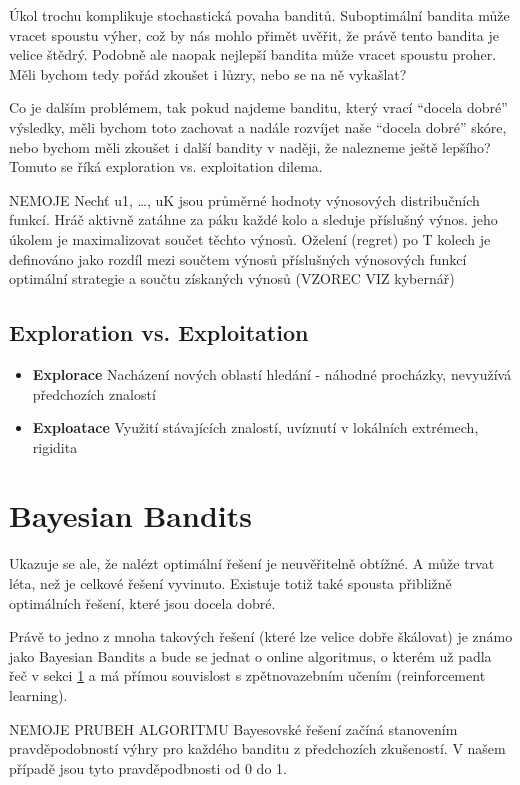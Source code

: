 \documentclass[thesis=M,czech]{FITthesis}[2014/05/07]
\begin{document}
Úkol trochu komplikuje stochastická povaha banditů. Suboptimální bandita může vracet spoustu výher, což by nás mohlo přimět uvěřit, že právě tento bandita je velice štědrý. Podobně ale naopak nejlepší bandita může vracet spoustu proher. Měli bychom tedy pořád zkoušet i lůzry, nebo se na ně vykašlat?

Co je dalším problémem, tak pokud najdeme banditu, který vrací “docela dobré” výsledky, měli bychom toto zachovat a nadále rozvíjet naše “docela dobré” skóre, nebo bychom měli zkoušet i další bandity v naději, že nalezneme ještě lepšího? Tomuto se říká exploration vs. exploitation dilema.

NEMOJE
Nechť u1, …, uK jsou průměrné hodnoty výnosových distribučních funkcí. Hráč aktivně zatáhne za páku každé kolo a sleduje příslušný výnos. jeho úkolem je maximalizovat součet těchto výnosů. Oželení (regret) po T kolech je definováno jako rozdíl mezi součtem výnosů příslušných výnosových funkcí optimální strategie a součtu získaných výnosů (VZOREC VIZ kybernář)

\subsection{Exploration vs. Exploitation}

\begin{itemize}
  \item \textbf{Explorace} Nacházení nových oblastí hledání - náhodné procházky, nevyužívá předchozích znalostí
  \item \textbf{Exploatace} Využití stávajících znalostí, uvíznutí v lokálních extrémech, rigidita
\end{itemize}	

\section{Bayesian Bandits}

Ukazuje se ale, že nalézt optimální řešení je neuvěřitelně obtížné. A může trvat léta, než je celkové řešení vyvinuto. Existuje totiž také spousta přibližně optimálních řešení, které jsou docela dobré. 

Právě to jedno z mnoha takových řešení (které lze velice dobře škálovat) je známo jako Bayesian Bandits a bude se jednat o online algoritmus, o kterém už padla řeč v sekci \ref{} a má přímou souvislost s zpětnovazebním učením (reinforcement learning).

NEMOJE PRUBEH ALGORITMU
Bayesovské řešení začíná stanovením pravděpodobností výhry pro každého banditu z předchozích zkušeností. V našem případě jsou tyto pravděpodbnosti od 0 do 1. 
\end{document}
